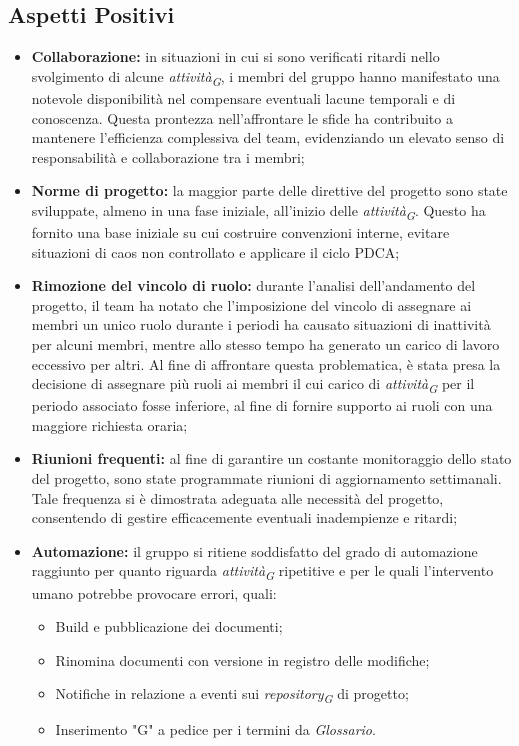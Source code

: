 \subsection{Aspetti Positivi}
\begin{itemize}
    \item \textbf{Collaborazione:} in situazioni in cui si sono verificati ritardi nello svolgimento di alcune \textit{attività}\textsubscript{\textit{G}}, i membri del gruppo hanno manifestato una notevole disponibilità nel compensare eventuali lacune temporali e di conoscenza. Questa prontezza nell'affrontare le sfide ha contribuito a mantenere l'efficienza complessiva del team, evidenziando un elevato senso di responsabilità e collaborazione tra i membri;
    \item \textbf{Norme di progetto:} la maggior parte delle direttive del progetto sono state sviluppate, almeno in una fase iniziale, all'inizio delle \textit{attività}\textsubscript{\textit{G}}. Questo ha fornito una base iniziale su cui costruire convenzioni interne, evitare situazioni di caos non controllato e applicare il ciclo PDCA;
    \item \textbf{Rimozione del vincolo di ruolo:} durante l'analisi dell'andamento del progetto, il team ha notato che l'imposizione del vincolo di assegnare ai membri un unico ruolo durante i periodi ha causato situazioni di inattività per alcuni membri, mentre allo stesso tempo ha generato un carico di lavoro eccessivo per altri.
    Al fine di affrontare questa problematica, è stata presa la decisione di assegnare più ruoli ai membri il cui carico di \textit{attività}\textsubscript{\textit{G}} per il periodo associato fosse inferiore, al fine di fornire supporto ai ruoli con una maggiore richiesta oraria;
    \item \textbf{Riunioni frequenti:} al fine di garantire un costante monitoraggio dello stato del progetto, sono state programmate riunioni di aggiornamento settimanali. Tale frequenza si è dimostrata adeguata alle necessità del progetto, consentendo di gestire efficacemente eventuali inadempienze e ritardi;
    \item \textbf{Automazione:} il gruppo si ritiene soddisfatto del grado di automazione raggiunto per quanto riguarda \textit{attività}\textsubscript{\textit{G}} ripetitive e per le quali l'intervento umano potrebbe provocare errori, quali:
    \begin{itemize}
        \item Build e pubblicazione dei documenti;
        \item Rinomina documenti con versione in registro delle modifiche;
        \item Notifiche in relazione a eventi sui \textit{repository}\textsubscript{\textit{G}} di progetto;
        \item Inserimento "G" a pedice per i termini da \textit{Glossario}.
    \end{itemize}


\end{itemize}

